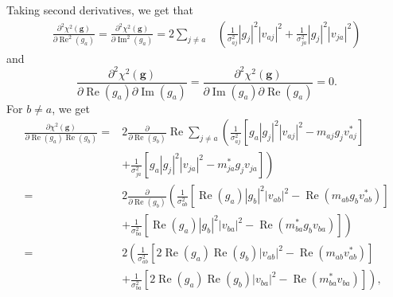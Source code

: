\documentclass{article}
\newcommand\re{\operatorname{Re}}
\newcommand\im{\operatorname{Im}}
\begin{document}
Taking second derivatives, we get that
\begin{equation}
\begin{split}
    \frac{\partial^2 \chi^2(\boldsymbol{g})}{\partial \re^2(g_a)} = \frac{\partial^2 \chi^2(\boldsymbol{g})}{\partial \im^2(g_a)} = 2 \sum_{j \ne a} 
    & \left( \frac{1}{\sigma_{aj}^2} |g_j|^2 |v_{aj}|^2 + \frac{1}{\sigma_{ja}^2} |g_j|^2 |v_{ja}|^2 \right)
\end{split}
\end{equation}
and
\begin{equation}
\frac{\partial^2 \chi^2(\boldsymbol{g})}{\partial \re(g_a) \partial \im(g_a)} = \frac{\partial^2 \chi^2(\boldsymbol{g})}{\partial \im(g_a) \partial \re(g_a)} = 0.
\end{equation}
For $b \ne a$, we get
\begin{equation}
\begin{split}
    \frac{\partial \chi^2(\boldsymbol{g})}{\partial \re(g_a) \re(g_b)} = & 2 \frac{\partial}{\partial \re(g_b)} \re \sum_{j \ne a} 
    \left( \frac{1}{\sigma_{aj}^2} \left[ g_a |g_j|^2 |v_{aj}|^2 - m_{aj} g_j v_{aj}^* \right] \right. \\
    &\left. + \frac{1}{\sigma_{ja}^2} \left[ g_a |g_j|^2 |v_{ja}|^2 - m_{ja}^* g_j v_{ja} \right] \right) \\
    =& 2 \frac{\partial}{\partial \re(g_b)} 
    \left( \frac{1}{\sigma_{ab}^2} \left[ \re(g_a) |g_b|^2 |v_{ab}|^2 - \re(m_{ab} g_b v_{ab}^*) \right] \right. \\
    &\left. + \frac{1}{\sigma_{ba}^2} \left[ \re(g_a) |g_b|^2 |v_{ba}|^2 - \re(m_{ba}^* g_b v_{ba}) \right] \right) \\
    =& 2
    \left( \frac{1}{\sigma_{ab}^2} \left[ 2 \re(g_a) \re(g_b) |v_{ab}|^2 - \re(m_{ab} v_{ab}^*) \right] \right. \\
    &\left. + \frac{1}{\sigma_{ba}^2} \left[ 2\re(g_a) \re(g_b) |v_{ba}|^2 - \re(m_{ba}^* v_{ba}) \right] \right), \\
\end{split}
\end{equation}
\end{document}
